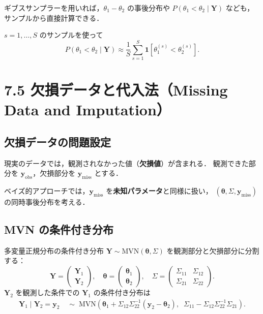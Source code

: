 \documentclass[lualatex,ja=standard,a4paper,12pt]{bxjsarticle}
\newcommand{\mvn}{\mathrm{MVN}}
\begin{document}
\begin{pointbox}
ギブスサンプラーを用いれば，$\theta_1 - \theta_2$ の事後分布や
$P(\theta_1 < \theta_2 \mid \bm{Y})$ なども，サンプルから直接計算できる．

$s = 1, \ldots, S$ のサンプルを使って
\[
  P(\theta_1 < \theta_2 \mid \bm{Y}) \approx \frac{1}{S}\sum_{s=1}^S \mathbf{1}\!\left[\theta_1^{(s)} < \theta_2^{(s)}\right].
\]
\end{pointbox}

\section{7.5 欠損データと代入法（Missing Data and Imputation）}

\subsection{欠損データの問題設定}

現実のデータでは，観測されなかった値（\textbf{欠損値}）が含まれる．
観測できた部分を $\bm{y}_{\text{obs}}$，欠損部分を $\bm{y}_{\text{miss}}$ とする．

\medskip
ベイズ的アプローチでは，$\bm{y}_{\text{miss}}$ を\textbf{未知パラメータ}と同様に扱い，
$(\bm{\theta}, \Sigma, \bm{y}_{\text{miss}})$ の同時事後分布を考える．

\subsection{MVN の条件付き分布}

\begin{thmbox}{多変量正規分布の条件付き分布}
$\bm{Y} \sim \mvn(\bm{\theta}, \Sigma)$ を観測部分と欠損部分に分割する：
\[
  \bm{Y} = \begin{pmatrix} \bm{Y}_1 \\ \bm{Y}_2 \end{pmatrix},\quad
  \bm{\theta} = \begin{pmatrix} \bm{\theta}_1 \\ \bm{\theta}_2 \end{pmatrix},\quad
  \Sigma = \begin{pmatrix} \Sigma_{11} & \Sigma_{12} \\ \Sigma_{21} & \Sigma_{22} \end{pmatrix}.
\]
$\bm{Y}_2$ を観測した条件での $\bm{Y}_1$ の条件付き分布は
\begin{align*}
  \bm{Y}_1 \mid \bm{Y}_2 = \bm{y}_2
  &\;\sim\; \mvn\!\left(\bm{\theta}_1 + \Sigma_{12}\Sigma_{22}^{-1}(\bm{y}_2 - \bm{\theta}_2),\;\;
    \Sigma_{11} - \Sigma_{12}\Sigma_{22}^{-1}\Sigma_{21}\right).
\end{align*}
\end{thmbox}
\end{document}
